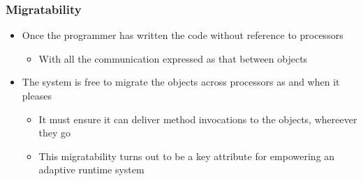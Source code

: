 \begin{frame}[t]
\frametitle{Migratability}
  \begin{itemize}
    \item Once the programmer has written the code without reference to processors
      \begin{itemize}
        \item With all the communication expressed as that between objects
      \end{itemize}
    \item The system is free to migrate the objects across processors as and when it pleases
      \begin{itemize}
        \item It must ensure it can deliver method invocations to the objects, whereever they go
        \item This migratability turns out to be a key attribute for empowering an adaptive runtime system
      \end{itemize}
  \end{itemize}
\end{frame}




